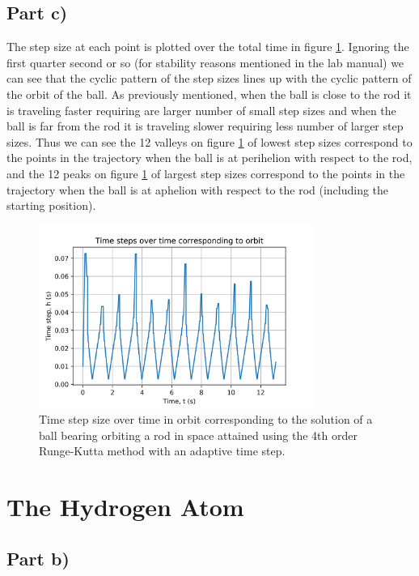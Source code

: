 \documentclass{article}
\begin{document}
\subsection{Part c)}
The step size at each point is plotted over the total time in figure \ref{fig:q1_c}. Ignoring the first quarter second or so (for stability reasons mentioned in the lab manual) we can see that the cyclic pattern of the step sizes lines up with the cyclic pattern of the orbit of the ball. As previously mentioned, when the ball is close to the rod it is traveling faster requiring are larger number of small step sizes and when the ball is far from the rod it is traveling slower requiring less number of larger step sizes. Thus we can see the 12 valleys on figure \ref{fig:q1_c} of lowest step sizes correspond to the points in the trajectory when the ball is at perihelion with respect to the rod, and the 12 peaks on figure \ref{fig:q1_c} of largest step sizes correspond to the points in the trajectory when the ball is at aphelion with respect to the rod (including the starting position).  

\begin{figure}[H]
	\centering
	\includegraphics[width=0.8\textwidth]{../images/q1_orbit_step.png}
	\caption{Time step size over time in orbit corresponding to the solution of a ball bearing orbiting a rod in space attained using the 4th order Runge-Kutta method with an adaptive time step.}
	\label{fig:q1_c}
\end{figure}


\section{The Hydrogen Atom}

\subsection{Part b)}
\end{document}
